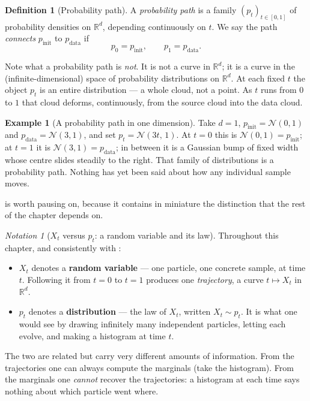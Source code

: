 \documentclass[11pt,a4paper]{report}
\theoremstyle{definition}
\newtheorem{definition}[definition]{Definition}
\newtheorem{example}[example]{Example}
\theoremstyle{remark}
\newtheorem{notation}[notation]{Notation}
\newcommand{\RR}{\mathbb R}
\begin{document}
\begin{definition}[Probability path]
\label{def:probability-path}
A \emph{probability path} is a family $(p_t)_{t\in[0,1]}$ of probability
densities on $\RR^d$, depending continuously on $t$. We say the path
\emph{connects} $p_{\mathrm{init}}$ to $p_{\mathrm{data}}$ if
\[
p_0 = p_{\mathrm{init}},
\qquad
p_1 = p_{\mathrm{data}} .
\]
\end{definition}

Note what a probability path is \emph{not}. It is not a curve in $\RR^d$;
it is a curve in the (infinite-dimensional) space of probability
distributions on $\RR^d$. At each fixed $t$ the object $p_t$ is an entire
distribution --- a whole cloud, not a point. As $t$ runs from $0$ to $1$
that cloud deforms, continuously, from the source cloud into the data
cloud.

\begin{example}[A probability path in one dimension]
\label{ex:first-path}
Take $d=1$, $p_{\mathrm{init}}=\mathcal N(0,1)$ and
$p_{\mathrm{data}}=\mathcal N(3,1)$, and set
$p_t = \mathcal N(3t,\,1)$.
At $t=0$ this is $\mathcal N(0,1)=p_{\mathrm{init}}$; at $t=1$ it is
$\mathcal N(3,1)=p_{\mathrm{data}}$; in between it is a Gaussian bump of
fixed width whose centre slides steadily to the right. That family of
distributions is a probability path. Nothing has yet been said about how
any individual sample moves.
\end{example}

 is worth pausing on, because it contains in miniature
the distinction that the rest of the chapter depends on.

\begin{notation}[$X_t$ versus $p_t$: a random variable and its law]
\label{not:Xt-vs-pt}
Throughout this chapter, and consistently with
:

\begin{itemize}
\item $X_t$ denotes a \textbf{random variable} --- one particle, one
      concrete sample, at time $t$. Following it from $t=0$ to $t=1$
      produces one \emph{trajectory}, a curve $t\mapsto X_t$ in $\RR^d$.
\item $p_t$ denotes a \textbf{distribution} --- the law of $X_t$, written
      $X_t\sim p_t$. It is what one would see by drawing infinitely many
      independent particles, letting each evolve, and making a histogram at
      time $t$.
\end{itemize}

The two are related but carry very different amounts of information. From
the trajectories one can always compute the marginals (take the
histogram). From the marginals one \emph{cannot} recover the trajectories:
a histogram at each time says nothing about which particle went where.
\end{notation}
\end{document}
